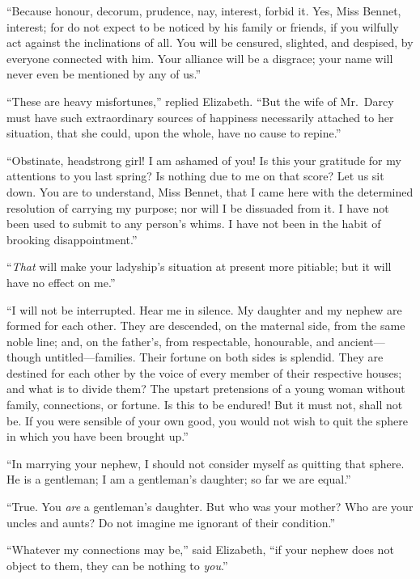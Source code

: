 \documentclass[12pt,english,oneside]{book}
\begin{document}
{}``Because honour, decorum, prudence, nay, interest, forbid it.
Yes, Miss Bennet, interest; for do not expect to be noticed by his
family or friends, if you wilfully act against the inclinations of
all. You will be censured, slighted, and despised, by everyone connected
with him. Your alliance will be a disgrace; your name will never even
be mentioned by any of us.''

{}``These are heavy misfortunes,'' replied Elizabeth. {}``But the
wife of Mr.\ Darcy must have such extraordinary sources of happiness
necessarily attached to her situation, that she could, upon the whole,
have no cause to repine.''

{}``Obstinate, headstrong girl! I am ashamed of you! Is this your
gratitude for my attentions to you last spring? Is nothing due to
me on that score? Let us sit down. You are to understand, Miss Bennet,
that I came here with the determined resolution of carrying my purpose;
nor will I be dissuaded from it. I have not been used to submit to
any person's whims. I have not been in the habit of brooking disappointment.''

{}``\textit{That} will make your ladyship's situation at present
more pitiable; but it will have no effect on me.''

{}``I will not be interrupted. Hear me in silence. My daughter and
my nephew are formed for each other. They are descended, on the maternal
side, from the same noble line; and, on the father's, from respectable,
honourable, and ancient\mbox{---}though untitled\mbox{--}--families.
Their fortune on both sides is splendid. They are destined for each
other by the voice of every member of their respective houses; and
what is to divide them? The upstart pretensions of a young woman without
family, connections, or fortune. Is this to be endured! But it must
not, shall not be. If you were sensible of your own good, you would
not wish to quit the sphere in which you have been brought up.''

{}``In marrying your nephew, I should not consider myself as quitting
that sphere. He is a gentleman; I am a gentleman's daughter; so far
we are equal.''

{}``True. You \textit{are} a gentleman's daughter. But who was your
mother? Who are your uncles and aunts? Do not imagine me ignorant
of their condition.''

{}``Whatever my connections may be,'' said Elizabeth, {}``if your
nephew does not object to them, they can be nothing to \textit{you}.''
\end{document}
